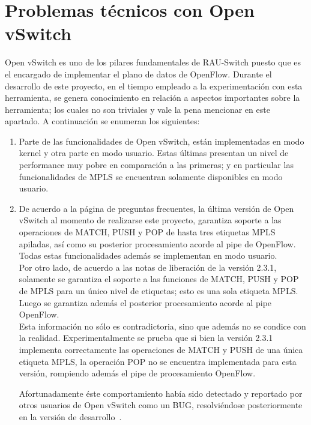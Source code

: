 \section{Problemas t\'ecnicos con Open vSwitch}
\label{apendiceB5}

Open vSwitch es uno de los pilares fundamentales de RAU-Switch puesto que es el encargado de implementar el plano de datos de OpenFlow. Durante el desarrollo de este proyecto, en el tiempo empleado a la experimentaci\'on con esta herramienta, se genera conocimiento en relaci\'on a aspectos importantes sobre la herramienta; los cuales no son triviales y vale la pena mencionar en este apartado. A continuaci\'on se enumeran los siguientes:\\ 

\begin{enumerate}
\item Parte de las funcionalidades de Open vSwitch, est\'an implementadas en modo kernel y otra parte en modo usuario. Estas \'ultimas presentan un nivel de performance muy pobre en comparaci\'on a las primeras; y en particular las funcionalidades de MPLS se encuentran solamente disponibles en modo usuario.

\item De acuerdo a la p\'agina de preguntas frecuentes, la \'ultima versi\'on de Open vSwitch al momento de realizarse este proyecto, garantiza soporte a las operaciones de MATCH, PUSH y POP de hasta tres etiquetas MPLS apiladas, as\'i como su posterior procesamiento acorde al pipe de OpenFlow. Todas estas funcionalidades adem\'as se implementan en modo usuario.\\

Por otro lado, de acuerdo  a las notas de liberaci\'on de la versi\'on 2.3.1, solamente se garantiza el soporte a las funciones de MATCH, PUSH y POP de MPLS para un \'unico nivel de etiquetas; esto es una sola etiqueta MPLS. Luego se garantiza adem\'as el posterior procesamiento acorde al pipe OpenFlow.\\

Esta informaci\'on no s\'olo es contradictoria, sino que adem\'as no se condice con la realidad. Experimentalmente se prueba que si bien la versi\'on 2.3.1 implementa correctamente las operaciones de MATCH y PUSH de una \'unica etiqueta MPLS, la operaci\'on POP no se encuentra implementada para esta versi\'on, rompiendo adem\'as el pipe de procesamiento OpenFlow. 

Afortunadamente \'este comportamiento hab\'ia sido detectado y reportado por otros usuarios de Open vSwitch como un BUG, resolviéndose posteriormente en la versi\'on de desarrollo~\citep{OVSSourceCode}.


\end{enumerate}
